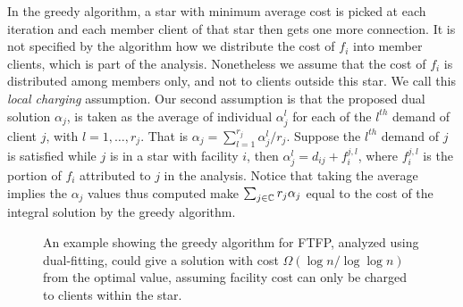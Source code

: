 \documentclass[oneside,final]{ucr}
\begin{document}
In the greedy algorithm, a star with minimum average cost is
picked at each iteration and each member client of that star
then gets one more connection. It is not specified by the
algorithm how we distribute the cost of $f_i$ into member
clients, which is part of the analysis. Nonetheless we
assume that the cost of $f_i$ is distributed among members
only, and not to clients outside this star. We call this
\emph{local charging} assumption. Our second assumption is
that the proposed dual solution $\alpha_j$, is taken as the
average of individual $\alpha_j^l$ for each of the $l^{th}$
demand of client $j$, with $l=1,\ldots,r_j$. That is
$\alpha_j = \sum_{l=1}^{r_j} \alpha_j^l / r_j$. Suppose the
$l^{th}$ demand of $j$ is satisfied while $j$ is in a star
with facility $i$, then $\alpha_j^l = d_{ij} + f_i^{j,l}$,
where $f_i^{j,l}$ is the portion of $f_i$ attributed to $j$
in the analysis. Notice that taking the average implies the
$\alpha_j$ values thus computed make $\sum_{j\in\mathbb{C}}
r_j \alpha_j$ equal to the cost of the integral solution by
the greedy algorithm.

\begin{figure}
  \centering
  \caption[$\Omega(\log n / \log\log n)$ example for
  dual-fitting on {\FTFP}]{An example showing the greedy
    algorithm for FTFP, analyzed using dual-fitting, could
    give a solution with cost $\Omega(\log n / \log\log n)$
    from the optimal value, assuming facility cost can only
    be charged to clients within the star.}
  \label{fig:greedy_lower_bound}
\end{figure}
\end{document}
